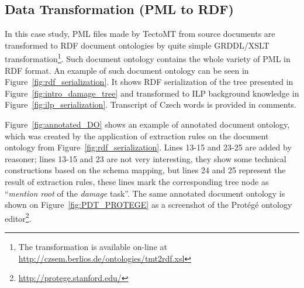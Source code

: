 \subsection{Data Transformation (PML to RDF)} \label{sec:onto_pml_to_rdf}

In this case study, PML files made by TectoMT from source documents are transformed to RDF document ontologies by quite simple GRDDL/XSLT transformation\footnote{The transformation is available on-line at \url{http://czsem.berlios.de/ontologies/tmt2rdf.xsl}}. Such document ontology contains the whole variety of PML in RDF format. An example of such document ontology can be seen in Figure~\ref{fig:rdf_serialization}. It shows RDF serialization of the tree presented in Figure~\ref{fig:intro_damage_tree} and transformed to ILP background knowledge in Figure~\ref{fig:ilp_serialization}. Transcript of Czech words is provided in comments.

Figure~\ref{fig:annotated_DO} shows an example of annotated document ontology, which was created by the application of extraction rules on the document ontology from Figure~\ref{fig:rdf_serialization}. Lines 13-15 and 23-25 are added by reasoner; lines 13-15 and 23 are not very interesting, they show some technical constructions based on the schema mapping, but lines 24 and 25 represent the result of extraction rules, these lines mark the corresponding tree node as ``\emph{mention root} of the \emph{damage} task''. The same annotated document ontology is shown on Figure~\ref{fig:PDT_PROTEGE} as a screenshot of the Protégé ontology editor\footnote{\url{http://protege.stanford.edu/}}.



